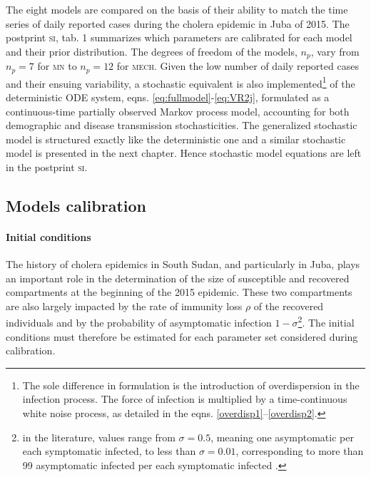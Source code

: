  The eight models are compared on the basis of their ability to match the time series of daily reported cases during the cholera epidemic in Juba of 2015. The postprint \textsc{si}, tab. 1 summarizes which parameters are calibrated for each model and their prior distribution. The degrees of freedom of the models, $n_p$, vary from $n_p=7$ for \textsc{mn} to $n_p=12$ for \textsc{mech}. Given the low number of daily reported cases and their ensuing variability, a stochastic equivalent is also implemented\footnote{The sole difference in formulation is the introduction of overdispersion in the infection process. The force of infection is multiplied by a time-continuous white noise process, as detailed in the eqns. \eqref{overdisp1}--\eqref{overdisp2}.} of the deterministic ODE system, eqns. \eqref{eq:fullmodel}-\eqref{eq:VR2j}, formulated as a continuous-time partially observed Markov process model, accounting for both demographic and disease transmission stochasticities\cite{Breto:TimeSeriesAnalysis:2009}. The generalized stochastic model is structured exactly like the deterministic one and a similar stochastic model is presented in the next chapter. Hence stochastic model equations are left in the postprint \textsc{si}.%

\subsection{Models calibration}
\paragraph{Initial conditions} The history of cholera epidemics in South Sudan, and particularly in Juba, plays an important role in the determination of the size of susceptible and recovered compartments at the beginning of the 2015 epidemic. These two compartments are also largely impacted by the rate of immunity loss $\rho$ of the recovered individuals and by the probability of asymptomatic infection $1-\sigma$\footnote[][2\baselineskip]{in the literature, values range from $\sigma=0.5$, meaning one asymptomatic per each symptomatic infected, to less than $\sigma=0.01$, corresponding to more than 99 asymptomatic infected per each symptomatic infected \parencite{Fung:CholeraTransmissionDynamic:2014}.}. The initial conditions must therefore be estimated for each parameter set considered during calibration.


